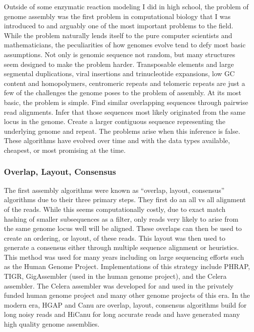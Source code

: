 \par{
Outside of some enzymatic reaction modeling I did in high school, the problem of genome assembly was the first problem in computational biology that I was introduced to and arguably one of the most important problems to the field. While the problem naturally lends itself to the pure computer scientists and mathematicians, the peculiarities of how genomes evolve tend to defy most basic assumptions. Not only is genomic sequence not random, but many structures seem designed to make the problem harder. Transposable elements and large segmental duplications, viral insertions and trinucleotide expansions, low GC content and homopolymers, centromeric repeats and telomeric repeats are just a few of the challenges the genome poses to the problem of assembly. At its most basic, the problem is simple. Find similar overlapping sequences through pairwise read alignments. Infer that those sequences most likely originated from the same locus in the genome. Create a larger contiguous sequence representing the underlying genome and repeat. The problems arise when this inference is false. These algorithms have evolved over time and with the data types available, cheapest, or most promising at the time.
}
\subsubsection{Overlap, Layout, Consensus}

\par{
The first assembly algorithms were known as ``overlap, layout, consensus'' algorithms due to their three primary steps. They first do an all vs all alignment of the reads. While this seems computationally costly, due to exact match hashing of smaller subsequences as a filter, only reads very likely to arise from the same genome locus well will be aligned\cite{OLC}. These overlaps can then be used to create an ordering, or layout, of these reads. This layout was then used to generate a consensus either through multiple sequence alignment or heuristics\cite{gene1}. This method was used for many years including on large sequencing efforts such as the Human Genome Project\cite{genomeproject}. Implementations of this strategy include PHRAP\cite{phrap}, TIGR\cite{tigr}, GigAssembler\cite{gigassembler} (used in the human genome project), and the Celera assembler\cite{Myers2000}. The Celera assembler was developed for and used in the privately funded human genome project\cite{privategenome} and many other genome projects of this era. In the modern era, HGAP and Canu are overlap, layout, consensus algorithms build for long noisy reads\cite{HGAP}\cite{canu} and HiCanu for long accurate reads\cite{HICANU} and have generated many high quality genome assemblies\cite{mosquito_assembly}.
}

